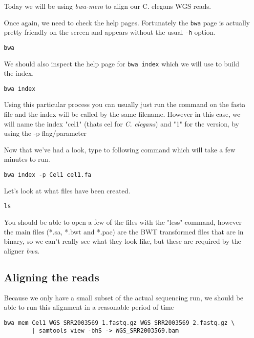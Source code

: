 Today we will be using \textit{bwa-mem} to align our C. elegans WGS reads.

\begin{steps}
Once again, we need to check the help pages.
Fortunately the \texttt{bwa} page is actually pretty friendly on the screen and appears without the usual \texttt{-h} option. \\
\begin{lstlisting}
bwa
\end{lstlisting}

We should also inspect the help page for \texttt{bwa index} which we will use to build the index.\\
\begin{lstlisting}
bwa index
\end{lstlisting}
Using this particular process you can usually just run the command on the fasta file and the index will be called by the same filename. However in this case, we will name the index "cel1" (thats cel for \textit{C. elegans}) and "1" for the version, by using the -p flag/parameter
\end{steps}

\begin{steps}
Now that we've had a look, type to following command which will take a few minutes to run.
\begin{lstlisting}
bwa index -p Cel1 cel1.fa
\end{lstlisting}
\end{steps}

\begin{steps}
Let's look at what files have been created.
\begin{lstlisting}
ls
\end{lstlisting}
You should be able to open a few of the files with the "less" command, however the main files (*.sa, *.bwt and *.pac) are the BWT transformed files that are in binary, so we can't really see what they look like, but these are required by the aligner \textit{bwa}.
\end{steps}

\subsection{Aligning the reads}
Because we only have a small subset of the actual sequencing run, we should be able to run this alignment in a reasonable period of time
\begin{lstlisting}
bwa mem Cel1 WGS_SRR2003569_1.fastq.gz WGS_SRR2003569_2.fastq.gz \
        | samtools view -bhS -> WGS_SRR2003569.bam
\end{lstlisting}

